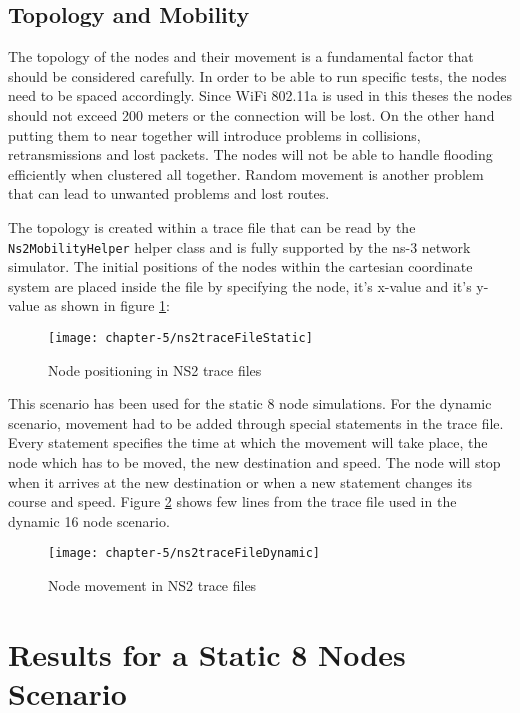 \subsection{Topology and Mobility}

The topology of the nodes and their movement is a fundamental factor that should be considered carefully. In order to be able to run specific tests, the nodes need to be spaced accordingly. Since WiFi 802.11a is used in this theses the nodes should not exceed 200 meters or the connection will be lost. On the other hand putting them to near together will introduce problems in collisions, retransmissions and lost packets. The nodes will not be able to handle flooding efficiently when clustered all together. Random movement is another problem that can lead to unwanted problems and lost routes.
 
The topology is created within a trace file that can be read by the \texttt{Ns2MobilityHelper} helper class and is fully supported by the ns-3 network simulator. The initial positions of the nodes within the cartesian coordinate system are placed inside the file by specifying the node, it's x-value and it's y-value as shown in figure \ref{fig:ns2traceFileStatic}:

\begin{figure}[H]
  \centering
  \texttt{[image: chapter-5/ns2traceFileStatic]}
  \caption{Node positioning in NS2 trace files}
  \label{fig:ns2traceFileStatic}
\end{figure}

\clearpage

This scenario has been used for the static 8 node simulations. For the dynamic scenario, movement had to be added through special statements in the trace file. Every statement specifies the time at which the movement will take place, the node which has to be moved, the new destination and speed. The node will stop when it arrives at the new destination or when a new statement changes its course and speed. Figure \ref{fig:ns2traceFileDynamic} shows few lines from the trace file used in the dynamic 16 node scenario.

\begin{figure}[H]
  \centering
  \texttt{[image: chapter-5/ns2traceFileDynamic]}
  \caption{Node movement in NS2 trace files}
  \label{fig:ns2traceFileDynamic}
\end{figure}

\clearpage

\section{Results for a Static 8 Nodes Scenario}

